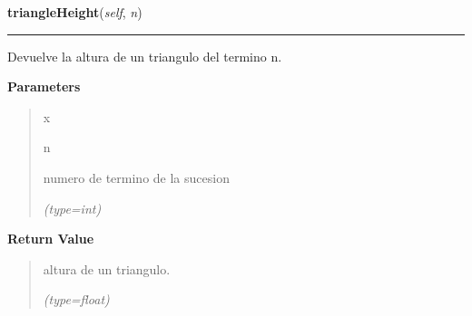 \hspace{.8\funcindent}\begin{boxedminipage}{\funcwidth}

    \raggedright \textbf{triangleHeight}(\textit{self}, \textit{n})

    \vspace{-1.5ex}

    \rule{\textwidth}{0.5\fboxrule}
\setlength{\parskip}{2ex}
    Devuelve la altura de un triangulo del termino n.

\setlength{\parskip}{1ex}
      \textbf{Parameters}
      \vspace{-1ex}

      \begin{quote}
        \begin{Ventry}{x}

          \item[n]

          numero de termino de la sucesion

            {\it (type=int)}

        \end{Ventry}

      \end{quote}

      \textbf{Return Value}
    \vspace{-1ex}

      \begin{quote}
      altura de un triangulo.

      {\it (type=float)}

      \end{quote}

    \end{boxedminipage}

    \label{FractalZE:sierpinsky:Sierpinsky:triangleWidth}

    \vspace{0.5ex}

